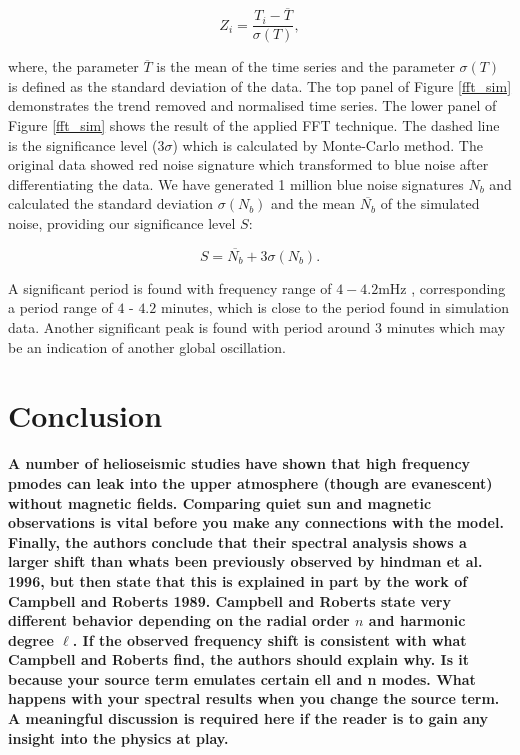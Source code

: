 \documentclass[linenumbers]{aastex63}
\newcommand{\bcr}{\bf\color{red}} %
\begin{document}
\begin{equation}
	Z_{i} = \frac {T_{i} - \overline{T}}  {\sigma(T)},
	\label{z_score}
\end{equation}

where, the parameter $\overline{T}$ is the mean of the time series and the parameter $\sigma(T)$ is defined as the standard deviation of the data. The top panel of Figure \ref{fft_sim} demonstrates the trend removed and normalised time series. The lower panel of Figure \ref{fft_sim} shows the result of the applied FFT technique. The dashed line is the significance level ($3 \sigma$) which is calculated by Monte-Carlo method. The original data showed red noise signature which transformed to blue noise after differentiating the data. We have generated 1 million blue noise signatures $N_{b}$ and calculated the standard deviation $\sigma(N_{b})$ and the mean $\overline{N_{b}}$ of the simulated noise, providing our significance level $S$:

\begin{equation}
    S = \overline{N_{b}} + 3 \sigma(N_{b}).
\end{equation}

A significant period is found with frequency range of $4-4.2$mHz , corresponding a period range of $4$ - $4.2$ minutes, which is close to the period found in simulation data. Another significant peak is found with period around $3$ minutes which may be an indication of another global oscillation.

\section{Conclusion}


{\bcr A number of helioseismic studies have shown that high frequency pmodes can leak into the upper atmosphere (though are evanescent) without magnetic fields. Comparing quiet sun and magnetic observations is vital before you make any connections with the model. Finally, the authors conclude that their spectral analysis shows a larger shift than whats been previously observed by hindman et al. 1996, but then state that this is explained in part by the work of Campbell and Roberts 1989. Campbell and Roberts state very different behavior depending on the radial order $n$ and harmonic degree $\ell$. If the observed frequency shift is consistent with what Campbell and Roberts find, the authors should explain why. Is it because your source term emulates certain ell and n modes. What happens with your spectral results when you change the source term. A meaningful discussion is required here if the reader is to gain any insight into the physics at play.

}
\end{document}
